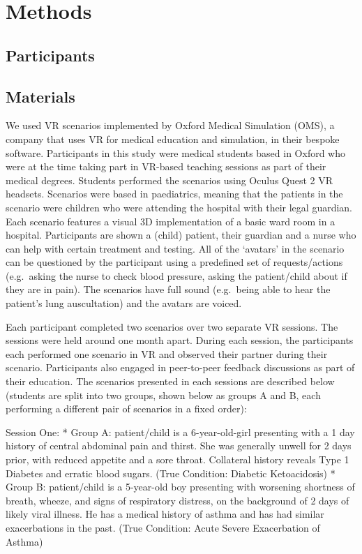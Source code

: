 \documentclass[a4paper, nobind]{templates/ociamthesis}
\begin{document}
\section*{Methods}\label{methods-2}

\subsection*{Participants}\label{participants-2}

\subsection*{Materials}\label{materials-2}

We used VR scenarios implemented by Oxford Medical Simulation (OMS), a company that uses VR for medical education and simulation, in their bespoke software. Participants in this study were medical students based in Oxford who were at the time taking part in VR-based teaching sessions as part of their medical degrees. Students performed the scenarios using Oculus Quest 2 VR headsets. Scenarios were based in paediatrics, meaning that the patients in the scenario were children who were attending the hospital with their legal guardian. Each scenario features a visual 3D implementation of a basic ward room in a hospital. Participants are shown a (child) patient, their guardian and a nurse who can help with certain treatment and testing. All of the `avatars' in the scenario can be questioned by the participant using a predefined set of requests/actions (e.g.~asking the nurse to check blood pressure, asking the patient/child about if they are in pain). The scenarios have full sound (e.g.~being able to hear the patient's lung auscultation) and the avatars are voiced.

Each participant completed two scenarios over two separate VR sessions. The sessions were held around one month apart. During each session, the participants each performed one scenario in VR and observed their partner during their scenario. Participants also engaged in peer-to-peer feedback discussions as part of their education. The scenarios presented in each sessions are described below (students are split into two groups, shown below as groups A and B, each performing a different pair of scenarios in a fixed order):

Session One:
* Group A: patient/child is a 6-year-old-girl presenting with a 1 day history of central abdominal pain and thirst. She was generally unwell for 2 days prior, with reduced appetite and a sore throat. Collateral history reveals Type 1 Diabetes and erratic blood sugars. (True Condition: Diabetic Ketoacidosis)
* Group B: patient/child is a 5-year-old boy presenting with worsening shortness of breath, wheeze, and signs of respiratory distress, on the background of 2 days of likely viral illness. He has a medical history of asthma and has had similar exacerbations in the past. (True Condition: Acute Severe Exacerbation of Asthma)
\end{document}
